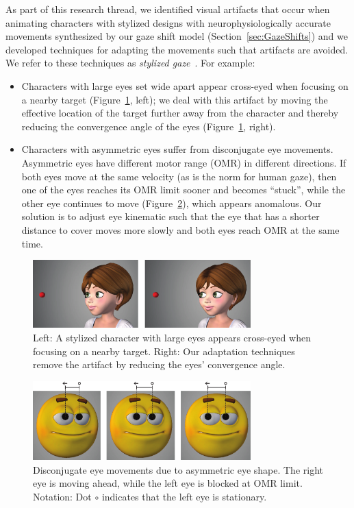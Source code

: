 As part of this research thread, we identified visual artifacts that occur when animating characters with stylized designs with neurophysiologically accurate movements synthesized by our gaze shift model (Section~\ref{sec:GazeShifts}) and we developed techniques for adapting the movements such that artifacts are avoided. We refer to these techniques as \emph{stylized gaze}~\citep{pejsa2013stylized}. For example:

\begin{itemize}
\item Characters with large eyes set wide apart appear cross-eyed when focusing on a nearby target (Figure~\ref{fig:CrossEyedness}, left); we deal with this artifact by moving the effective location of the target further away from the character and thereby reducing the convergence angle of the eyes (Figure~\ref{fig:CrossEyedness}, right).
\item Characters with asymmetric eyes suffer from disconjugate eye movements. Asymmetric eyes have different motor range (OMR) in different directions. If both eyes move at the same velocity (as is the norm for human gaze), then one of the eyes reaches its OMR limit sooner and becomes ``stuck'', while the other eye continues to move (Figure~\ref{fig:StuckEye}), which appears anomalous. Our solution is to adjust eye kinematic such that the eye that has a shorter distance to cover moves more slowly and both eyes reach OMR at the same time.
\end{itemize}

\begin{figure}
\centering
\includegraphics[width=0.75\textwidth]{figures/CrossEyedness.pdf}
\caption{Left: A stylized character with large eyes appears cross-eyed when focusing on a nearby target. Right: Our adaptation techniques remove the artifact by reducing the eyes' convergence angle.}
\label{fig:CrossEyedness}
\end{figure}

\begin{figure}
\centering
\includegraphics[width=0.75\textwidth]{figures/StuckEye.pdf}
\caption{Disconjugate eye movements due to asymmetric eye shape. The right eye is moving ahead,
while the left eye is blocked at OMR limit. Notation: Dot $\circ$ indicates that the left eye is stationary.}
\label{fig:StuckEye}
\end{figure}


